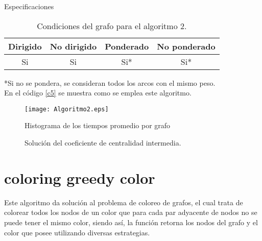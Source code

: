 \documentclass[12pt]{article}
\begin{document}
Especificaciones

\begin{table}[H] 
\caption{{\small Condiciones del grafo para el algoritmo 2.}}
\begin{center}
\begin{tabular}{|c|c|c|c|}
\hline
Dirigido & No dirigido & Ponderado & No ponderado \\ \hline
Si       & Si          & Si*        & Si*        \\  \hline
\end{tabular}
\label{cua2}
\end{center}
\end{table}

*{\small Si no se pondera, se consideran todos los arcos con el mismo peso.}  \\

En el código \ref{c5} se muestra como se emplea este algoritmo.  

 \label{c5}


\begin{figure}[H]
\begin{center}
	\texttt{[image: Algoritmo2.eps]}
\end{center}
\vspace{-.3cm}
\caption{{\small Histograma de los tiempos promedio por grafo}}
\end{figure}


\begin{figure}[H]
\centering
{}\hspace{5mm}
\vspace{10mm}
\hspace{10mm}
\vspace{10mm}
\caption{Solución del coeficiente de centralidad intermedia.} \label{g2}
\end{figure}

\newpage
\section{coloring greedy color}
Este algoritmo da solución al problema de coloreo de grafos, el cual trata de colorear todos los nodos de un color que para cada par adyacente de nodos no se puede tener el mismo color, siendo así, la función  retorna los nodos del grafo y el color que posee utilizando diversas estrategias. \\
\end{document}
